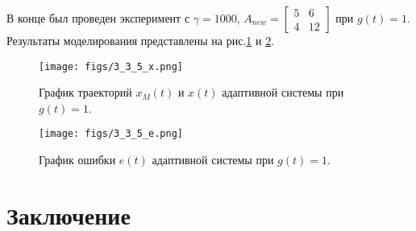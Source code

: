 \documentclass{article}
\begin{document}
В конце был проведен эксперимент с $\gamma=1000$, $A_{new} =\begin{bmatrix} 5 & 6 \\ 4 & 12\end{bmatrix}$ при $g(t) = 1$. Результаты моделирования представлены на рис.\ref{fig:3_3_5_x} и \ref{fig:3_3_5_e}.

\begin{figure}[h!]
  \centering
  \texttt{[image: figs/3\_3\_5\_x.png]}
  \caption{График траекторий $x_M(t)$ и $x(t)$ адаптивной системы при $g(t) = 1$.} 
  \label{fig:3_3_5_x}
\end{figure}

\begin{figure}[h!]
  \centering
  \texttt{[image: figs/3\_3\_5\_e.png]}
  \caption{График ошибки $e(t)$ адаптивной системы при $g(t) = 1$.} 
  \label{fig:3_3_5_e}
\end{figure}

\FloatBarrier
\section{Заключение}
\end{document}
